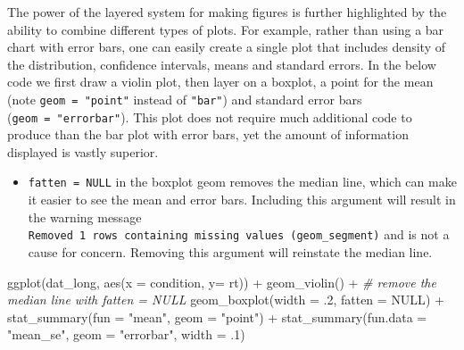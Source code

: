 \documentclass[
  english,
  doc,floatsintext]{apa6}
\newenvironment{Shaded}{\begin{snugshade}}{\end{snugshade}}
\newcommand{\AttributeTok}[1]{\textcolor[rgb]{0.77,0.63,0.00}{#1}}
\newcommand{\CommentTok}[1]{\textcolor[rgb]{0.56,0.35,0.01}{\textit{#1}}}
\newcommand{\ConstantTok}[1]{\textcolor[rgb]{0.00,0.00,0.00}{#1}}
\newcommand{\DecValTok}[1]{\textcolor[rgb]{0.00,0.00,0.81}{#1}}
\newcommand{\FunctionTok}[1]{\textcolor[rgb]{0.00,0.00,0.00}{#1}}
\newcommand{\NormalTok}[1]{#1}
\newcommand{\SpecialCharTok}[1]{\textcolor[rgb]{0.00,0.00,0.00}{#1}}
\newcommand{\StringTok}[1]{\textcolor[rgb]{0.31,0.60,0.02}{#1}}
\providecommand{\tightlist}{%
  \setlength{\itemsep}{0pt}\setlength{\parskip}{0pt}}
\begin{document}
The power of the layered system for making figures is further highlighted by the ability to combine different types of plots. For example, rather than using a bar chart with error bars, one can easily create a single plot that includes density of the distribution, confidence intervals, means and standard errors. In the below code we first draw a violin plot, then layer on a boxplot, a point for the mean (note \texttt{geom\ =\ "point"} instead of \texttt{"bar"}) and standard error bars (\texttt{geom\ =\ "errorbar"}). This plot does not require much additional code to produce than the bar plot with error bars, yet the amount of information displayed is vastly superior.

\begin{itemize}
\tightlist
\item
  \texttt{fatten\ =\ NULL} in the boxplot geom removes the median line, which can make it easier to see the mean and error bars. Including this argument will result in the warning message \texttt{Removed\ 1\ rows\ containing\ missing\ values\ (geom\_segment)} and is not a cause for concern. Removing this argument will reinstate the median line.
\end{itemize}

\begin{Shaded}
\begin{Highlighting}[]
\FunctionTok{ggplot}\NormalTok{(dat\_long, }\FunctionTok{aes}\NormalTok{(}\AttributeTok{x =}\NormalTok{ condition, }\AttributeTok{y=}\NormalTok{ rt)) }\SpecialCharTok{+}
  \FunctionTok{geom\_violin}\NormalTok{() }\SpecialCharTok{+}
  \CommentTok{\# remove the median line with fatten = NULL}
  \FunctionTok{geom\_boxplot}\NormalTok{(}\AttributeTok{width =}\NormalTok{ .}\DecValTok{2}\NormalTok{, }
               \AttributeTok{fatten =} \ConstantTok{NULL}\NormalTok{) }\SpecialCharTok{+}
  \FunctionTok{stat\_summary}\NormalTok{(}\AttributeTok{fun =} \StringTok{"mean"}\NormalTok{, }\AttributeTok{geom =} \StringTok{"point"}\NormalTok{) }\SpecialCharTok{+}
  \FunctionTok{stat\_summary}\NormalTok{(}\AttributeTok{fun.data =} \StringTok{"mean\_se"}\NormalTok{, }
               \AttributeTok{geom =} \StringTok{"errorbar"}\NormalTok{, }
               \AttributeTok{width =}\NormalTok{ .}\DecValTok{1}\NormalTok{)}
\end{Highlighting}
\end{Shaded}
\end{document}

